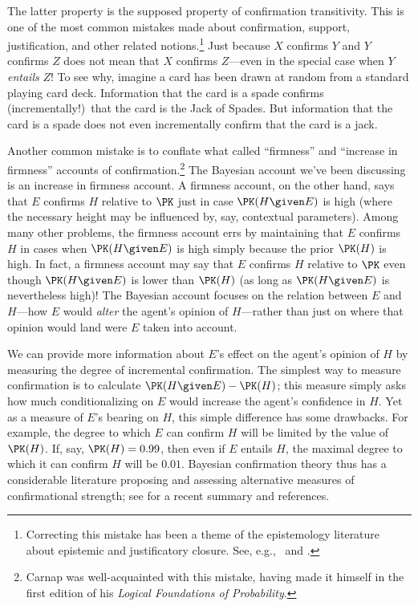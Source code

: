 The latter property is the supposed property of confirmation transitivity. This is one of the most common mistakes made about confirmation, support, justification, and other related notions.\footnote
{Correcting this mistake has been a theme of the epistemology literature about epistemic and justificatory closure. See, e.g.,\ \citet{DretskeOperators,DaviesArchitecturalism} and \citet{WrightReflections}.}
 Just because $X$ confirms $Y$ and $Y$ confirms $Z$ does not mean that $X$ confirms $Z$---even in the special case when $Y$ \emph{entails} $Z$! To see why, imagine a card has been drawn at random from a standard playing card deck. Information that the card is a spade confirms (incrementally!)\ that the card is the Jack of Spades. But information that the card is a spade does not even incrementally confirm that the card is a jack.
 
Another common mistake is to conflate what \citet{CarnapLogicalSecond} called ``firmness'' and ``increase in firmness'' accounts of confirmation.\footnote
{Carnap was well-acquainted with this mistake, having made it himself in the first \citeyear{CarnapLogical} edition of his \emph{Logical Foundations of Probability}.}
 The Bayesian account we've been discussing is an increase in firmness account. A firmness account, on the other hand, says that $E$ confirms $H$ relative to $\PK$ just in case $\PK(H \given E)$ is high (where the necessary height may be influenced by, say, contextual parameters). Among many other problems, the firmness account errs by maintaining that $E$ confirms $H$ in cases when $\PK(H \given E)$ is high simply because the prior $\PK(H)$ is high. In fact, a firmness account may say that $E$ confirms $H$ relative to $\PK$ even though $\PK(H \given E)$ is lower than $\PK(H)$ (as long as $\PK(H \given E)$ is nevertheless high)! The Bayesian account focuses on the relation between $E$ and $H$---how $E$ would \emph{alter} the agent's opinion of $H$---rather than just on where that opinion would land were $E$ taken into account.
 
We can provide more information about $E$'s effect on the agent's opinion of $H$ by measuring the degree of incremental confirmation. The simplest way to measure confirmation is to calculate $\PK(H \given E)-\PK(H)$; this measure simply asks how much conditionalizing on $E$ would increase the agent's confidence in $H$. Yet as a measure of $E$'s bearing on $H$, this simple difference has some drawbacks. For example, the degree to which $E$ can confirm $H$ will be limited by the value of $\PK(H)$. If, say, $\PK(H)=0.99$, then even if $E$ entails $H$, the maximal degree to which it can confirm $H$ will be $0.01$. Bayesian confirmation theory thus has a considerable literature proposing and assessing alternative measures of confirmational strength; see \citet[Section 3.4]{CrupiSEP} for a recent summary and references.

